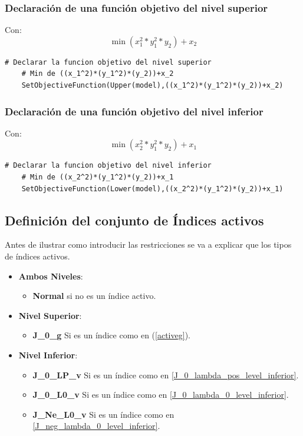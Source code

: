 \subsubsection{ Declaración de una función objetivo del nivel superior}
Con: $$\min (x_1^2*y_1^2*y_2) + x_2$$
\begin{lstlisting}[caption={ Declarar una función objetivo del nivel superior}]
    # Declarar la funcion objetivo del nivel superior
    # Min de ((x_1^2)*(y_1^2)*(y_2))+x_2
    SetObjectiveFunction(Upper(model),((x_1^2)*(y_1^2)*(y_2))+x_2)
\end{lstlisting}

\subsubsection{Declaración de una función objetivo del nivel inferior}

Con: $$\min (x_2^2*y_1^2*y_2)+x_1$$
\begin{lstlisting}[caption={Declarar una función objetivo del nivel inferior.}]
    # Declarar la funcion objetivo del nivel inferior
    # Min de ((x_2^2)*(y_1^2)*(y_2))+x_1
    SetObjectiveFunction(Lower(model),((x_2^2)*(y_1^2)*(y_2))+x_1)
\end{lstlisting}

\subsection{Definición del conjunto de Índices activos}

Antes de ilustrar como introducir las restricciones se va a explicar 
que los tipos de índices activos.

\begin{itemize}
    \item \textbf{Ambos Niveles}:
        \begin{itemize}
            \item \textbf{Normal} si no es un índice activo.
        \end{itemize}
    \item \textbf{Nivel Superior}:
     \begin{itemize}
        \item \textbf{J\_0\_g} Si es un índice como en (\ref{activeg}).
     \end{itemize}
    \item \textbf{Nivel Inferior}:
    \begin{itemize}
        \item \textbf{J\_0\_LP\_v} Si es un índice como en \ref{J_0_lambda_pos_level_inferior}.
        \item  \textbf{J\_0\_L0\_v} Si es un índice como en \ref{J_0_lambda_0_level_inferior}.
        \item  \textbf{J\_Ne\_L0\_v} Si es un índice como en \ref{J_neg_lambda_0_level_inferior}.
    \end{itemize}
\end{itemize}


